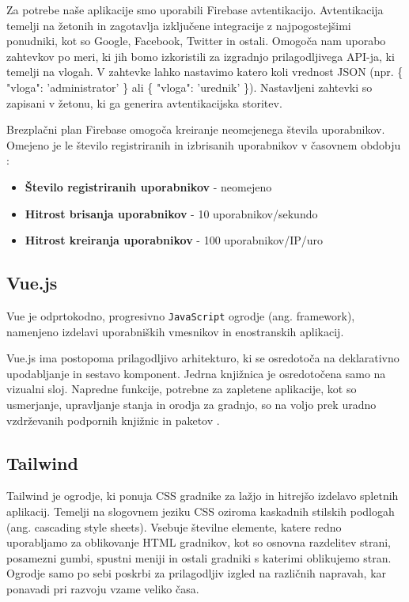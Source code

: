 Za potrebe naše aplikacije smo uporabili Firebase avtentikacijo. Avtentikacija temelji na žetonih in zagotavlja izključene integracije z najpogostejšimi ponudniki, kot so Google, Facebook, Twitter in ostali. Omogoča nam uporabo zahtevkov po meri, ki jih bomo izkoristili za izgradnjo prilagodljivega API-ja, ki temelji na vlogah. V zahtevke lahko nastavimo katero koli vrednost JSON (npr. \{ "vloga": 'administrator' \} ali \{ "vloga": 'urednik' \}). Nastavljeni zahtevki so zapisani v žetonu, ki ga generira avtentikacijska storitev.

Brezplačni plan Firebase omogoča kreiranje neomejenega števila uporabnikov. Omejeno je le število registriranih in izbrisanih uporabnikov v časovnem obdobju \cite{firebase-limits}:


\begin{itemize}
\item \textbf{Število registriranih uporabnikov} - neomejeno
\item \textbf{Hitrost brisanja uporabnikov} - 10 uporabnikov/sekundo
\item \textbf{Hitrost kreiranja uporabnikov} - 100 uporabnikov/IP/uro
\end{itemize}


\subsection{Vue.js}
\label{vue-js-section}
Vue je odprtokodno, progresivno \verb=JavaScript= ogrodje (ang. framework), namenjeno izdelavi uporabniških vmesnikov in enostranskih aplikacij.

Vue.js ima postopoma prilagodljivo arhitekturo, ki se osredotoča na deklarativno upodabljanje in sestavo komponent. Jedrna knjižnica je osredotočena samo na vizualni sloj. Napredne funkcije, potrebne za zapletene aplikacije, kot so usmerjanje, upravljanje stanja in orodja za gradnjo, so na voljo prek uradno vzdrževanih podpornih knjižnic in paketov \cite{vue-js-what-is}.

\subsection{Tailwind}
\label{tailwind-section}
Tailwind je ogrodje, ki ponuja CSS gradnike za lažjo in hitrejšo izdelavo spletnih aplikacij. Temelji na slogovnem jeziku CSS oziroma kaskadnih stilskih podlogah (ang. cascading style sheets). Vsebuje številne elemente, katere redno uporabljamo za oblikovanje HTML gradnikov, kot so osnovna razdelitev strani, posamezni gumbi, spustni meniji in ostali gradniki s katerimi oblikujemo stran. Ogrodje samo po sebi poskrbi za prilagodljiv izgled na različnih napravah, kar ponavadi pri razvoju vzame veliko časa.

